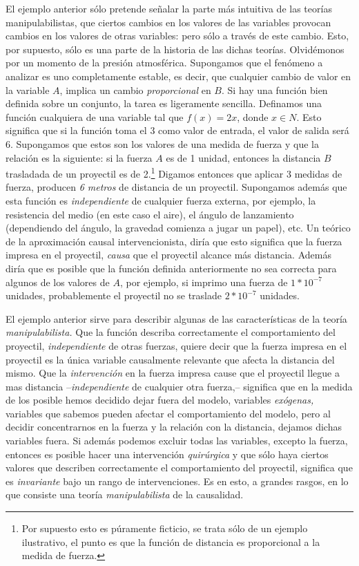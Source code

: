 El ejemplo anterior sólo pretende señalar la parte más intuitiva de
las teorías manipulabilistas, que ciertos cambios en los valores de
las variables provocan cambios en los valores de otras variables: pero
sólo a través de este cambio. Esto, por supuesto, sólo es una parte de la
historia de las dichas teorías. Olvidémonos por un momento de la presión
atmosférica. Supongamos que el fenómeno a analizar es uno completamente
estable, es decir, que cualquier cambio de valor en la variable $ A $,
implica un cambio \emph{proporcional} en $ B $. Si hay una función bien
definida sobre un conjunto, la tarea es ligeramente sencilla. Definamos
una función cualquiera de una variable tal que $ f( x ) = 2x $, donde $ x
	\in{ N } $. Esto significa que si la función toma el $ 3 $ como valor de
entrada, el valor de salida será $ 6 $. Supongamos que estos son los
valores de una medida de fuerza y que la relación es la siguiente: si la
fuerza $ A $ es de 1 unidad, entonces la distancia $ B $ trasladada de un
proyectil es de 2.\footnote{
	Por supuesto esto es púramente ficticio, se trata sólo de un ejemplo
	ilustrativo, el punto es que la
	función de distancia es proporcional a la medida de fuerza.
}
Digamos entonces que aplicar 3 medidas de fuerza, producen \emph{6 metros}
de distancia de un proyectil. Supongamos además que esta función es
\emph{independiente} de cualquier fuerza externa, por ejemplo, la
resistencia del medio (en este caso el aire), el ángulo de
lanzamiento (dependiendo del ángulo, la gravedad comienza a jugar un
papel), etc. Un teórico de la aproximación causal intervencionista,
diría que esto significa que la fuerza impresa en el proyectil,
\emph{causa} que el proyectil alcance más distancia. Además diría que
es posible que la función definida anteriormente no sea correcta para
algunos de los valores de $ A $, por ejemplo, si imprimo una fuerza de
$ 1*10^{ -7 } $ unidades, probablemente el proyectil no se traslade
$ 2*10^{ -7 } $ unidades.

El ejemplo anterior sirve para describir algunas de las
características de la teoría \emph{manipulabilista.} Que la función
describa correctamente el comportamiento del proyectil,
\emph{independiente} de otras fuerzas, quiere decir que la fuerza
impresa en el proyectil es la única variable causalmente relevante
que afecta la distancia del mismo. Que la \emph{intervención} en la
fuerza impresa cause que el proyectil llegue a mas distancia
--\emph{independiente} de cualquier otra fuerza,-- significa que en
la medida de los posible hemos decidido dejar fuera del modelo,
variables \emph{exógenas,} variables que sabemos pueden afectar el comportamiento del modelo, pero al decidir concentrarnos en la fuerza y la relación con la distancia, dejamos dichas variables fuera. Si además podemos excluir todas las variables,
excepto la fuerza, entonces es posible hacer una intervención
\emph{quirúrgica} y que sólo haya ciertos valores que describen
correctamente el comportamiento del proyectil, significa que es
\emph{invariante} bajo un rango de intervenciones. Es en esto, a
grandes rasgos, en lo que consiste una teoría \emph{manipulabilista}
de la causalidad.

